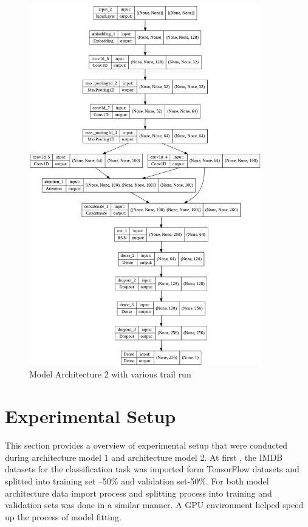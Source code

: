 \documentclass{article}
\begin{document}
\begin{figure}[H]
    \centering
    \includegraphics[width=0.9\textwidth]{Model 2.png}
    \caption{Model Architecture 2 with various trail run}
    \label{fig:compute2}
\end{figure}

%
%

\section{Experimental Setup}
This section provides a overview of experimental setup that were conducted  during architecture model 1 and architecture model 2. 
At first , the IMDB datasets for the classification task was imported form TensorFlow datasets and splitted into  training set –50\% and validation set-50\%. For both model architecture data import process and splitting process into training and validation sets was done in a similar manner. A GPU environment helped speed up the process of model fitting.
\end{document}
